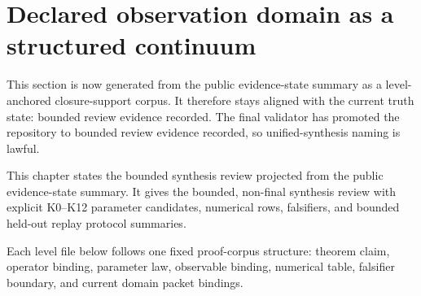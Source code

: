 \section{Declared observation domain as a structured continuum}
\label{sec:observed-universe-continuum}

This section is now generated from the public evidence-state summary as a level-anchored closure-support corpus.
It therefore stays aligned with the current truth state: bounded review evidence recorded. The final validator has promoted the repository to bounded review evidence recorded, so unified-synthesis naming is lawful.

This chapter states the bounded synthesis review projected from the public evidence-state summary. It gives the bounded, non-final synthesis review with explicit K0--K12 parameter candidates, numerical rows, falsifiers, and bounded held-out replay protocol summaries.

Each level file below follows one fixed proof-corpus structure: theorem claim, operator binding, parameter law, observable binding, numerical table, falsifier boundary, and current domain packet bindings.














